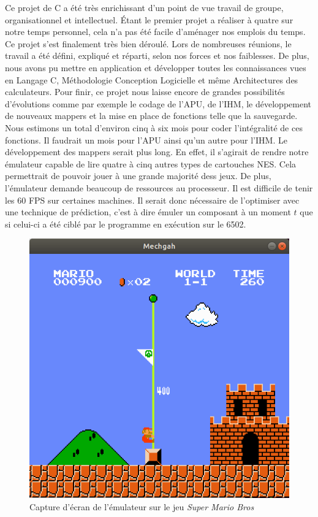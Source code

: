 Ce projet de C a été très enrichissant d'un point de vue travail de groupe, organisationnel et intellectuel. Étant le premier projet a réaliser à quatre sur notre temps personnel, cela n'a pas été facile d'aménager nos emplois du temps. Ce projet s'est finalement très bien déroulé. Lors de nombreuses réunions, le travail a été défini, expliqué et réparti, selon nos forces et nos faiblesses. De plus, nous avons pu mettre en application et développer toutes les connaissances vues en Langage C, Méthodologie Conception Logicielle et même Architectures des calculateurs. Pour finir, ce projet nous laisse encore de grandes possibilités d'évolutions comme par exemple le codage de l'APU, de l'IHM, le développement de nouveaux mappers et la mise en place de fonctions telle que la sauvegarde. Nous estimons un total d'environ cinq à six mois pour coder l'intégralité de ces fonctions. Il faudrait un mois pour l'APU ainsi qu'un autre pour l'IHM. Le développement des mappers serait plus long. En effet, il s'agirait de rendre notre émulateur capable de lire quatre à cinq autres types de cartouches NES. Cela permettrait de pouvoir jouer à une grande majorité dess jeux. De plus, l'émulateur demande beaucoup de ressources au processeur. Il est difficile de tenir les 60 FPS sur certaines machines. Il serait donc nécessaire de l'optimiser avec une technique de prédiction, c'est à dire émuler un composant à un moment $t$ que si celui-ci a été ciblé par le programme en exécution sur le 6502.

\begin{figure}[H]
  \centering
   \includegraphics[width=0.50\linewidth]{images/smb_nes.png}
   \caption{Capture d'écran de l'émulateur sur le jeu \emph{Super Mario Bros}}
   \label{fig:gantt_fin}
\end{figure}
